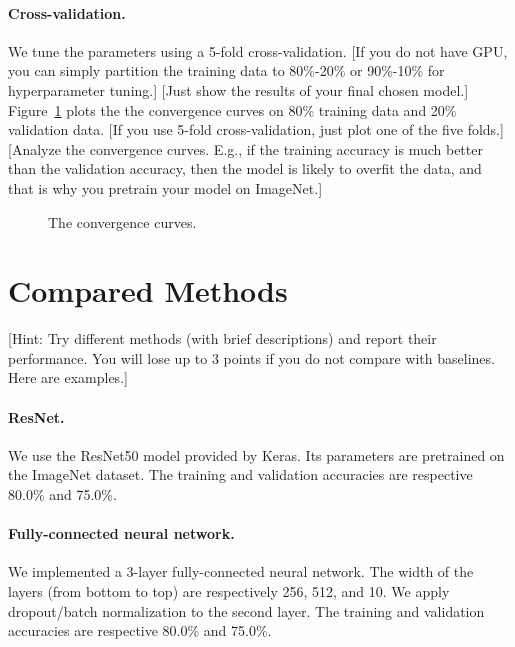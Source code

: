 \documentclass[11pt]{article}
\numberwithin{equation}{section}
\begin{document}
\paragraph{Cross-validation.}
We tune the parameters using a 5-fold cross-validation. [If you do not have GPU, you can simply partition the training data to 80\%-20\% or 90\%-10\% for hyperparameter tuning.]
[Just show the results of your final chosen model.]
Figure~\ref{fig:convergence} plots the the convergence curves on 80\% training data and 20\% validation data. [If you use 5-fold cross-validation, just plot one of the five folds.]
[Analyze the convergence curves. E.g., if the training accuracy is much better than the validation accuracy, then the model is likely to overfit the data, and that is why you pretrain your model on ImageNet.] 


\begin{figure}
	\begin{center}
	\end{center}
	\caption{The convergence curves.}
	\label{fig:convergence}
\end{figure}





\section{Compared Methods}


[Hint: Try different methods (with brief descriptions) and report their performance.
You will lose up to 3 points if you do not compare with baselines.
Here are examples.]


\paragraph{ResNet.}
We use the ResNet50 model provided by Keras. Its parameters are pretrained on the ImageNet dataset. The training and validation accuracies are respective 80.0\% and 75.0\%.



\paragraph{Fully-connected neural network.}
We implemented a 3-layer fully-connected neural network.
The width of the layers (from bottom to top) are respectively 256, 512, and 10.
We apply dropout/batch normalization to the second layer.
The training and validation accuracies are respective 80.0\% and 75.0\%.
\end{document}
